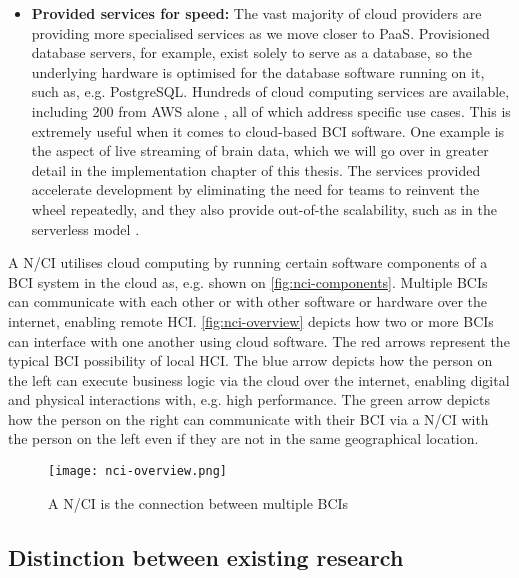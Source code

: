 \begin{itemize}
  \item \textbf{Provided services for speed:} The vast majority of cloud providers are providing more specialised services as we move closer to PaaS. Provisioned database servers, for example, exist solely to serve as a database, so the underlying hardware is optimised for the database software running on it, such as, e.g. PostgreSQL. Hundreds of cloud computing services are available, including 200 from AWS alone \citep{amazon_web_services_inc_what_nodate}, all of which address specific use cases. This is extremely useful when it comes to cloud-based BCI software. One example is the aspect of live streaming of brain data, which we will go over in greater detail in the implementation chapter of this thesis. The services provided accelerate development by eliminating the need for teams to reinvent the wheel repeatedly, and they also provide out-of-the scalability, such as in the serverless model \citep{redhat_what_2022}.
\end{itemize}

A N/CI utilises cloud computing by running certain software components of a BCI system in the cloud as, e.g. shown on \autoref{fig:nci-components}. Multiple BCIs can communicate with each other or with other software or hardware over the internet, enabling remote HCI. \autoref{fig:nci-overview} depicts how two or more BCIs can interface with one another using cloud software. The red arrows represent the typical BCI possibility of local HCI. The blue arrow depicts how the person on the left can execute business logic via the cloud over the internet, enabling digital and physical interactions with, e.g. high performance. The green arrow depicts how the person on the right can communicate with their BCI via a N/CI with the person on the left even if they are not in the same geographical location.

\begin{figure}[ht]
  \centering
  \texttt{[image: nci-overview.png]}
  \caption{A N/CI is the connection between multiple BCIs}
  \label{fig:nci-overview}
\end{figure}

\subsection{Distinction between existing research}
\label{chapter2-distinction-between-existing-research}

